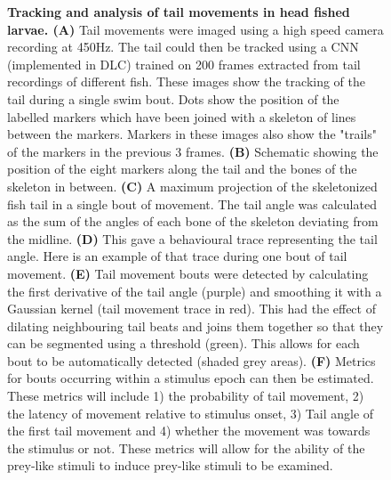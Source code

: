 \begin{figure}[!ht]
       \caption[\label{fig:R3_F6} \textbf{Tracking and analysis of tail movements in head fished larvae.}]{\label{fig:R3_F6} \textbf{Tracking and analysis of tail movements in head fished larvae. (A)} Tail movements were imaged using a high speed camera recording at 450Hz. The tail could then be tracked using a CNN (implemented in DLC) trained on 200 frames extracted from tail recordings of different fish. These images show the tracking of the tail during a single swim bout. Dots show the position of the labelled markers which have been joined with a skeleton of lines between the markers. Markers in these images also show the "trails" of the markers in the previous 3 frames. \textbf{(B)} Schematic showing the position of the eight markers along the tail and the bones of the skeleton in between. \textbf{(C)} A maximum projection of the skeletonized fish tail in a single bout of movement. The tail angle was calculated as the sum of the angles of each bone of the skeleton deviating from the midline. \textbf{(D)}  This gave a behavioural trace representing the tail angle. Here is an example of that trace during one bout of tail movement. \textbf{(E)} Tail movement bouts were detected by calculating the first derivative of the tail angle (purple) and smoothing it with a Gaussian kernel (tail movement trace in red). This had the effect of dilating neighbouring tail beats and joins them together so that they can be segmented using a threshold (green). This allows for each bout to be automatically detected (shaded grey areas). \textbf{(F)} Metrics for bouts occurring within a stimulus epoch can then be estimated. These metrics will include 1) the probability of tail movement, 2) the latency of movement relative to stimulus onset, 3) Tail angle of the first tail movement and 4) whether the movement was towards the stimulus or not. These metrics will allow for the ability of the prey-like stimuli to induce prey-like stimuli to be examined.
       }
\end{figure}

